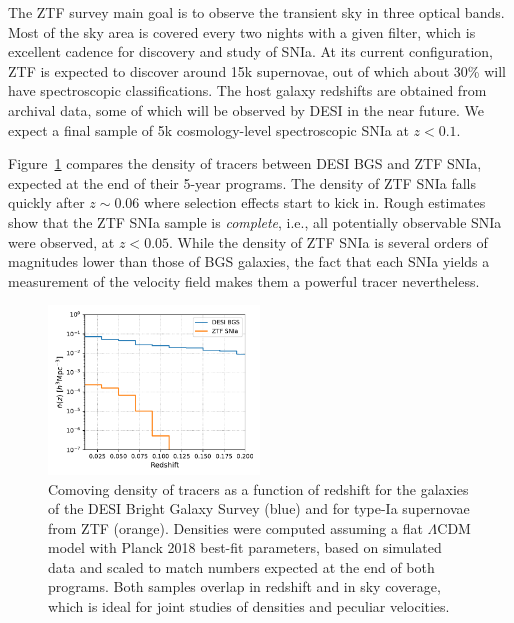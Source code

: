 The ZTF survey main goal is to observe the transient sky in three optical bands. 
Most of the sky area is covered every two nights with a given filter, which is excellent cadence 
for discovery and study of SNIa. 
At its current configuration, ZTF is expected to discover around 15k supernovae, 
out of which about 30\% will have spectroscopic classifications. 
The host galaxy redshifts are obtained from archival data, some of which will be observed by DESI 
in the near future. We expect a final sample of 5k cosmology-level spectroscopic SNIa at  
$z < 0.1$. 

Figure~\ref{fig:nz_desi_ztf} compares the density of tracers between DESI BGS and ZTF SNIa, expected at 
the end of their 5-year programs. The density of ZTF SNIa falls quickly after $z \sim 0.06$ where 
selection effects start to kick in. Rough estimates show that the ZTF SNIa sample is \emph{complete},
i.e., all potentially observable SNIa were observed, at $z < 0.05$. 
While the density of ZTF SNIa is several orders of magnitudes lower 
than those of BGS galaxies, the fact that each SNIa yields a measurement of the velocity field 
makes them a powerful tracer nevertheless. 

\begin{figure}[t]
    \centering
    \includegraphics[width=0.5\textwidth]{fig/velocities/nz_desi_ztf.pdf}
    \caption{Comoving density of tracers as a function of redshift for the galaxies of 
    the DESI Bright Galaxy Survey (blue) and for type-Ia supernovae from ZTF (orange).
    Densities were computed assuming a flat $\Lambda$CDM model with 
    Planck 2018 best-fit parameters, based on simulated data and scaled to 
    match numbers expected at the end of both programs. 
    Both samples overlap in redshift and in sky coverage, which is ideal for joint studies 
    of densities and peculiar velocities. 
    }
    \label{fig:nz_desi_ztf}
\end{figure}


